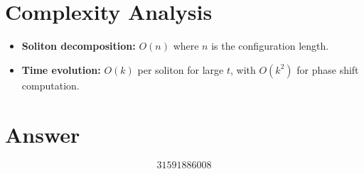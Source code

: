 \documentclass[11pt]{article}
\begin{document}
\section{Complexity Analysis}
\begin{itemize}
    \item \textbf{Soliton decomposition:} $O(n)$ where $n$ is the configuration length.
    \item \textbf{Time evolution:} $O(k)$ per soliton for large $t$, with $O(k^2)$ for phase shift computation.
\end{itemize}

\section{Answer}

\[
\boxed{31591886008}
\]
\end{document}

